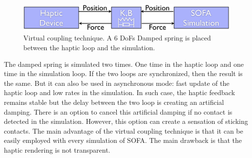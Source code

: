 \begin{figure}
\centering
 \includegraphics[width=\linewidth]{haptic2.png}
 \caption{Virtual coupling technique. A 6 DoFs Damped spring is placed between the haptic loop and the simulation.}
 \label{fig:haptic2}
\end{figure}

The damped spring is simulated two times. One time in the haptic loop and one time in the simulation loop. 
If the two loops are synchronized, then the result is the same. But it can also be used in asynchronous mode: fast update of the haptic loop and low rates in the simulation.
In such case, the haptic feedback remains stable but the delay between the two loop is creating an artificial damping.
There is an option to cancel this artificial damping if no contact is detected in the simulation. However, this option can create a sensation of sticking contacts. 
The main advantage of the virtual coupling technique is that it can be easily employed with every simulation of SOFA. The main drawback is that the haptic rendering is not transparent.
 
